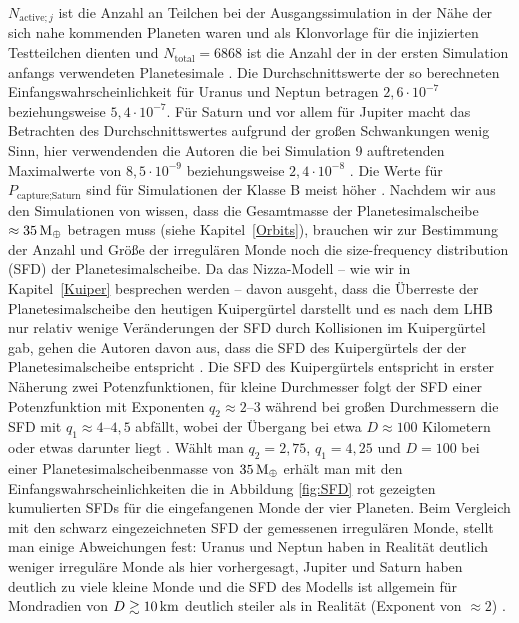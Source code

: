 \documentclass[12pt,a4paper,twoside,open=right,bibliography=totoc]{scrbook}
\renewcommand{\cite}{ \citep}
\newcommand{\refsec}[1]{siehe Kapitel~\ref{#1}}
\newcommand{\ME}{M_\oplus}
\begin{document}
$N_{\text{active}; j}$ ist die Anzahl an Teilchen bei der Ausgangssimulation in der Nähe der sich nahe kommenden Planeten waren und als Klonvorlage für die injizierten Testteilchen dienten und $N_{\text{total}} = 6868$ ist die Anzahl der in der ersten Simulation anfangs verwendeten Planetesimale\cite{Nesvorny2007}.
Die Durchschnittswerte der so berechneten Einfangswahrscheinlichkeit für Uranus und Neptun betragen $2,6 \cdot 10^{-7}$ beziehungsweise $5,4 \cdot 10^{-7}$.
Für Saturn und vor allem für Jupiter macht das Betrachten des Durchschnittswertes aufgrund der großen Schwankungen wenig Sinn, hier verwendenden die Autoren die bei Simulation 9 auftretenden Maximalwerte von $8,5 \cdot 10^{-9}$ beziehungsweise $2,4 \cdot 10^{-8}$\cite{Nesvorny2007}.
Die Werte für $P_{\text{capture;Saturn}}$ sind für Simulationen der Klasse B meist höher\cite{Nesvorny2007}.
Nachdem wir aus den Simulationen von \cite{Tsiganis2005} wissen, dass die Gesamtmasse der Planetesimalscheibe $\approx\unit[35]{\ME}$ betragen muss (\refsec{Orbits}),
brauchen wir zur Bestimmung der Anzahl und Größe der irregulären Monde noch die size-frequency distribution (SFD) der Planetesimalscheibe.
Da das Nizza-Modell – wie wir in Kapitel~\ref{Kuiper} besprechen werden – davon ausgeht, dass die Überreste der Planetesimalscheibe den heutigen Kuipergürtel darstellt und es nach dem LHB nur relativ wenige Veränderungen der SFD durch Kollisionen im Kuipergürtel gab, gehen die Autoren davon aus, dass die SFD des Kuipergürtels der der Planetesimalscheibe entspricht\cite{Nesvorny2007}.
Die SFD des Kuipergürtels entspricht in erster Näherung zwei Potenzfunktionen, für kleine Durchmesser folgt der SFD einer Potenzfunktion mit Exponenten $q_2 \approx 2\text{--}3$ während bei großen Durchmessern die SFD mit $q_1 \approx 4\text{--}4,5$ abfällt, wobei der Übergang bei etwa $D \approx 100$ Kilometern oder etwas darunter liegt\cite{Gladman2001,Trujillo2001a,Bernstein2004,Petit2006,Nesvorny2007}.
Wählt man $q_2 = 2,75$, $q_1 = 4,25$ und $D = 100$ bei einer Planetesimalscheibenmasse von $\unit[35]{\ME}$ erhält man mit den  Einfangswahrscheinlichkeiten die in Abbildung \ref{fig:SFD} rot gezeigten kumulierten SFDs für die eingefangenen Monde der vier Planeten.
Beim Vergleich mit den schwarz eingezeichneten SFD der gemessenen irregulären Monde,
stellt man einige Abweichungen fest:
Uranus und Neptun haben in Realität deutlich weniger irreguläre Monde als hier vorhergesagt,
Jupiter und Saturn haben deutlich zu viele kleine Monde und die SFD des Modells ist allgemein für Mondradien von $D\gtrsim \unit[10]{km}$ deutlich steiler als in Realität (Exponent von $\approx2$)\cite{Nesvorny2007}.
\end{document}
